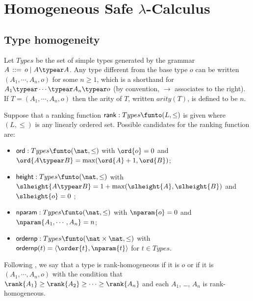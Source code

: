 \section{Homogeneous Safe $\lambda$-Calculus}
\label{sec:safe_homog}

\subsection{Type homogeneity}
Let $Types$ be the set of simple types generated by the grammar $A
\, ::= \, o \; | \; A \typear A$. Any type different from the base
type $o$ can be written $(A_1, \cdots, A_n, o)$ for some $n \geq 1$,
which is a shorthand for $A_1 \typear \cdots \typear A_n \typear o$ (by
convention, $\rightarrow$ associates to the right). If $T=(A_1,
\cdots, A_n, o)$ then the arity of $T$, written $arity(T)$, is
defined to be $n$.

Suppose that a ranking function ${\sf rank} :
Types \funto (L, \leq)$ is given where $(L, \leq)$ is any linearly ordered
set. Possible candidates for the ranking function are:
\begin{itemize}
\item ${\sf ord} : Types \funto (\nat,\leq)$ with $\ord{o} = 0$
and $\ord{A \typear B} = \max(\ord{A}+1, \ord{B})$;
\item ${\sf height} : Types \funto (\nat,\leq)$ with
$\slheight{A \typear B} = 1 + \max(\slheight{A}, \slheight{B})$ and
$\slheight{o} = 0$ ;
\item ${\sf nparam} : Types \funto (\nat,\leq)$ with $\nparam{o} = 0$
and $\nparam{A_1, \cdots, A_n} = n$;
\item ${\sf ordernp} : Types \funto (\nat \times \nat,\leq)$ with $ {\sf ordernp} (t)  = \langle \order{t}, \nparam{t} \rangle$ for $t \in Types$.
\end{itemize}
Following \cite{KNU02}, we say that a type is {\sf rank}-homogeneous
if it is $o$ or if it is $(A_1, \cdots, A_n, o)$ with the condition
that $\rank{A_1} \geq \rank{A_2}\geq \cdots \geq \rank{A_n}$ and
each $A_1$, \ldots, $A_n$ is {\sf rank}-homogeneous.



